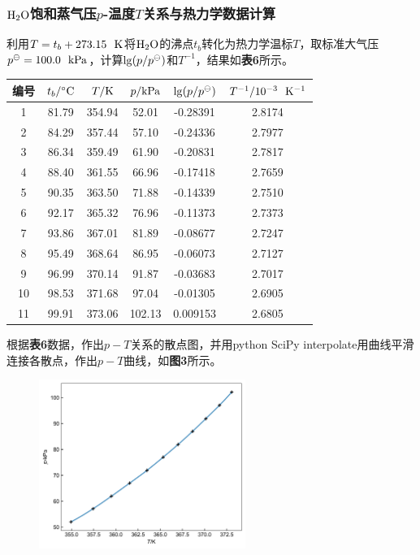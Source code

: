 \documentclass[12pt]{article}
\begin{document}
\subsubsection{$\rm H_{2}O$饱和蒸气压$p$-温度$T$关系与热力学数据计算}
利用$T=t_{b}+273.15\ \ {\rm K}$将$\rm H_{2}O$的沸点$t_{b}$转化为热力学温标$T$，取标准大气压$p^{\ominus}=100.0\ \ {\rm kPa}$，计算${\rm lg}(p/p^{\ominus})$和$T^{-1}$，结果如\textbf{表6}所示。
\begin{table}[h]
	\centering
	\begin{tabular}{cccccc}
		\toprule
		编号 & $t_{b}/{\rm ^{\circ}C}$& $T/{\rm K}$ & $p/{\rm kPa}$ & ${\rm lg}(p/p^{\ominus})$ & $T^{-1}/{\rm 10^{-3}\ \ K^{-1}}$\\
		\midrule
		1  & 81.79 & 354.94 & 52.01  & -0.28391 & 2.8174 \\
		2  & 84.29 & 357.44 & 57.10  & -0.24336 & 2.7977 \\
		3  & 86.34 & 359.49 & 61.90  & -0.20831 & 2.7817 \\
		4  & 88.40 & 361.55 & 66.96  & -0.17418 & 2.7659 \\
		5  & 90.35 & 363.50 & 71.88  & -0.14339 & 2.7510 \\
		6  & 92.17 & 365.32 & 76.96  & -0.11373 & 2.7373 \\
		7  & 93.86 & 367.01 & 81.89  & -0.08677 & 2.7247 \\
		8  & 95.49 & 368.64 & 86.95  & -0.06073 & 2.7127 \\
		9  & 96.99 & 370.14 & 91.87  & -0.03683 & 2.7017 \\
		10 & 98.53 & 371.68 & 97.04  & -0.01305 & 2.6905 \\
		11 & 99.91 & 373.06 & 102.13 & 0.009153 & 2.6805 \\
		\bottomrule
	\end{tabular}
\end{table}
\par

根据\textbf{表6}数据，作出$p-T$关系的散点图，并用python SciPy interpolate用曲线平滑连接各散点，作出$p-T$曲线，如\textbf{图3}所示。
\begin{figure}[h]
	\centering
	\includegraphics[width=0.6\textwidth]{3.jpg}
\end{figure}
\par
\end{document}
